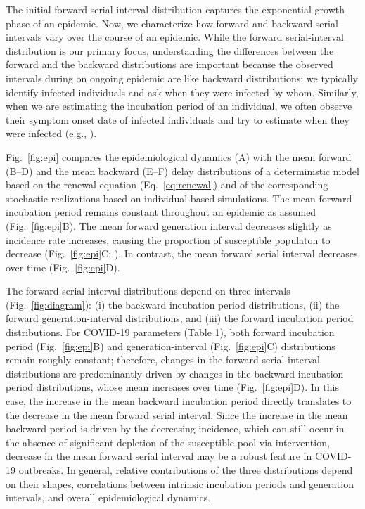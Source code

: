 \documentclass[12pt]{article}
\newcommand{\eref}[1]{Eq.~\ref{eq:#1}}
\newcommand{\fref}[1]{Fig.~\ref{fig:#1}}
\begin{document}
The initial forward serial interval distribution captures the exponential growth phase of an epidemic.
Now, we characterize how forward and backward serial intervals vary over the course of an epidemic.
While the forward serial-interval distribution is our primary focus, understanding the differences between the forward and the backward distributions are important because the observed intervals during on ongoing epidemic are like backward distributions:
we typically identify infected individuals and ask when they were infected by whom.
Similarly, when we are estimating the incubation period of an individual, we often observe their symptom onset date of infected individuals and try to estimate when they were infected (e.g., \cite{backer2020incubation}).

\fref{epi} compares the epidemiological dynamics (A) with the mean forward (B--D) and the mean backward (E--F) delay distributions of a deterministic model based on the renewal equation (\eref{renewal}) and of the corresponding stochastic realizations based on individual-based simulations.
The mean forward incubation period remains constant throughout an epidemic as assumed (\fref{epi}B).
The mean forward generation interval decreases slightly as incidence rate increases, causing the proportion of susceptible populaton to decrease (\fref{epi}C; \cite{kenah2008generation, champredon2015intrinsic}).
In contrast, the mean forward serial interval decreases over time (\fref{epi}D).

The forward serial interval distributions depend on three intervals (\fref{diagram}): (i) the backward incubation period distributions, (ii) the forward generation-interval distributions, and (iii) the forward incubation period distributions.
For COVID-19 parameters (Table 1), both forward incubation period (\fref{epi}B) and generation-interval (\fref{epi}C) distributions remain roughly constant;
therefore, changes in the forward serial-interval distributions are predominantly driven by changes in the backward incubation period distributions, whose mean increases over time (\fref{epi}D).
In this case, the increase in the mean backward incubation period directly translates to the decrease in the mean forward serial interval.
Since the increase in the mean backward period is driven by the decreasing incidence, which can still occur in the absence of significant depletion of the susceptible pool via intervention, decrease in the mean forward serial interval may be a robust feature in COVID-19 outbreaks.
In general, relative contributions of the three distributions depend on their shapes, correlations between intrinsic incubation periods and generation intervals, and overall epidemiological dynamics.
\end{document}
